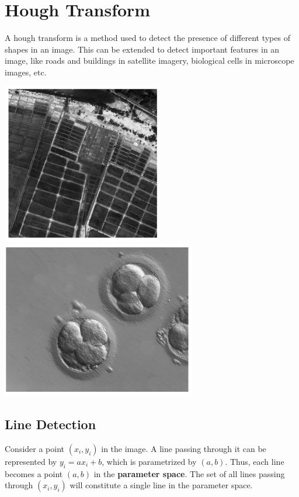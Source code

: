 \documentclass{report}
\begin{document}

\chapter{Hough Transform}

A hough transform is a method used to detect the presence of different types of shapes in an image. This can be extended to detect important features in an image, like roads and buildings in satellite imagery, biological cells in microscope images, etc.
\begin{center}
  \includegraphics[scale=0.77]{"images/08.png"} \qquad
  \includegraphics[scale=0.8]{"images/09.png"}
\end{center}

\section{Line Detection}

Consider a point $(x_i,y_i)$ in the image. A line passing through it can be represented by $y_i = ax_i + b$, which is parametrized by $(a,b)$. Thus, each line becomes a point $(a,b)$ in the \textbf{parameter space}. The set of all lines passing through $(x_i,y_i)$ will constitute a single line in the parameter space.
\end{document}
